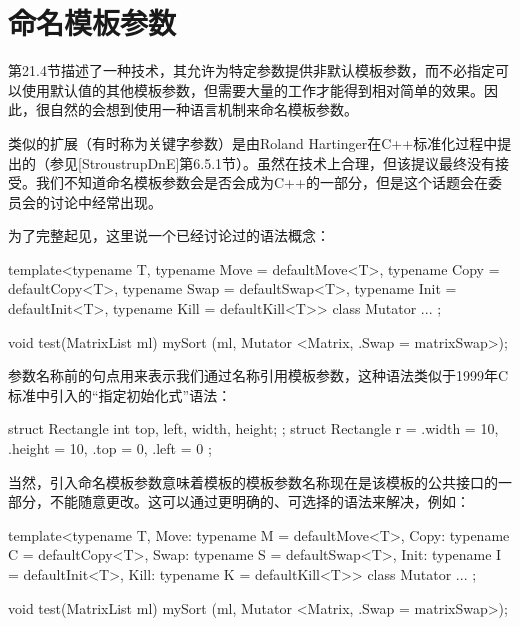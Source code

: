 \section{命名模板参数}
第21.4节描述了一种技术，其允许为特定参数提供非默认模板参数，而不必指定可以使用默认值的其他模板参数，但需要大量的工作才能得到相对简单的效果。因此，很自然的会想到使用一种语言机制来命名模板参数。

类似的扩展（有时称为关键字参数）是由Roland Hartinger在C++标准化过程中提出的（参见[StroustrupDnE]第6.5.1节）。虽然在技术上合理，但该提议最终没有接受。我们不知道命名模板参数会是否会成为C++的一部分，但是这个话题会在委员会的讨论中经常出现。

为了完整起见，这里说一个已经讨论过的语法概念：

\begin{cpp}
template<typename T,
	typename Move = defaultMove<T>,
	typename Copy = defaultCopy<T>,
	typename Swap = defaultSwap<T>,
	typename Init = defaultInit<T>,
	typename Kill = defaultKill<T>>
class Mutator {
	...
};

void test(MatrixList ml)
{
	mySort (ml, Mutator <Matrix, .Swap = matrixSwap>);
}
\end{cpp}

参数名称前的句点用来表示我们通过名称引用模板参数，这种语法类似于1999年C标准中引入的“指定初始化式”语法：

\begin{cpp}
struct Rectangle { int top, left, width, height; };
struct Rectangle r = { .width = 10, .height = 10, .top = 0, .left = 0 };
\end{cpp}

当然，引入命名模板参数意味着模板的模板参数名称现在是该模板的公共接口的一部分，不能随意更改。这可以通过更明确的、可选择的语法来解决，例如：

\begin{cpp}
template<typename T,
	Move: typename M = defaultMove<T>,
	Copy: typename C = defaultCopy<T>,
	Swap: typename S = defaultSwap<T>,
	Init: typename I = defaultInit<T>,
	Kill: typename K = defaultKill<T>>
class Mutator {
	...
};

void test(MatrixList ml)
{
	mySort (ml, Mutator <Matrix, .Swap = matrixSwap>);
}
\end{cpp}









































